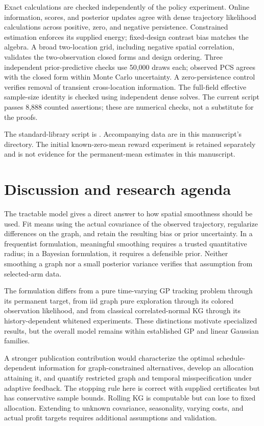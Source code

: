 \documentclass[11pt]{article}
\begin{document}
Exact calculations are checked independently of the policy experiment. Online information, scores, and posterior updates agree with dense trajectory likelihood calculations across positive, zero, and negative persistence. Constrained estimation enforces its supplied energy; fixed-design contrast bias matches the algebra. A broad two-location grid, including negative spatial correlation, validates the two-observation closed forms and design ordering. Three independent prior-predictive checks use 50,000 draws each; observed PCS agrees with the closed form within Monte Carlo uncertainty. A zero-persistence control verifies removal of transient cross-location information. The full-field effective sample-size identity is checked using independent dense solves. The current script passes 8,888 counted assertions; these are numerical checks, not a substitute for the proofs.

The standard-library script is . Accompanying data are in this manuscript's  directory. The initial known-zero-mean reward experiment is retained separately and is not evidence for the permanent-mean estimates in this manuscript.

\section{Discussion and research agenda}
The tractable model gives a direct answer to how spatial smoothness should be used. Fit means using the actual covariance of the observed trajectory, regularize differences on the graph, and retain the resulting bias or prior uncertainty. In a frequentist formulation, meaningful smoothing requires a trusted quantitative radius; in a Bayesian formulation, it requires a defensible prior. Neither smoothing a graph nor a small posterior variance verifies that assumption from selected-arm data.

The formulation differs from a pure time-varying GP tracking problem through its permanent target, from iid graph pure exploration through its colored observation likelihood, and from classical correlated-normal KG through its history-dependent whitened experiments. These distinctions motivate specialized results, but the overall model remains within established GP and linear Gaussian families.

A stronger publication contribution would characterize the optimal schedule-dependent information for graph-constrained alternatives, develop an allocation attaining it, and quantify restricted graph and temporal misspecification under adaptive feedback. The stopping rule here is correct with supplied certificates but has conservative sample bounds. Rolling KG is computable but can lose to fixed allocation. Extending to unknown covariance, seasonality, varying costs, and actual profit targets requires additional assumptions and validation.
\end{document}
